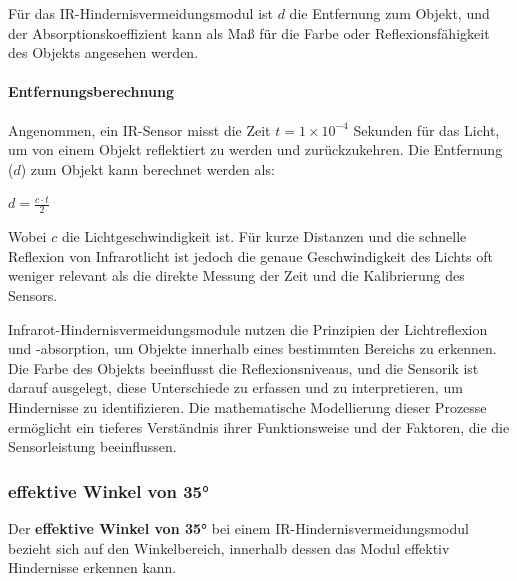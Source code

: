 \documentclass{vorlage-design-main}
\begin{document}
Für das IR-Hindernisvermeidungsmodul ist $d$ die Entfernung zum
Objekt, und der Absorptionskoeffizient kann als Maß für die Farbe oder
Reflexionsfähigkeit des Objekts angesehen werden.

\hypertarget{entfernungsberechnung}{%
\paragraph{Entfernungsberechnung}\label{entfernungsberechnung}}

Angenommen, ein IR-Sensor misst die Zeit $t = 1 \times 10^{-4}$
Sekunden für das Licht, um von einem Objekt reflektiert zu werden und
zurückzukehren. Die Entfernung ($d$) zum Objekt kann berechnet werden
als:

$d = \frac{c \cdot t}{2}$

Wobei $c$ die Lichtgeschwindigkeit ist. Für kurze Distanzen und die
schnelle Reflexion von Infrarotlicht ist jedoch die genaue
Geschwindigkeit des Lichts oft weniger relevant als die direkte Messung
der Zeit und die Kalibrierung des Sensors.

Infrarot-Hindernisvermeidungsmodule nutzen die Prinzipien der
Lichtreflexion und -absorption, um Objekte innerhalb eines bestimmten
Bereichs zu erkennen. Die Farbe des Objekts beeinflusst die
Reflexionsniveaus, und die Sensorik ist darauf ausgelegt, diese
Unterschiede zu erfassen und zu interpretieren, um Hindernisse zu
identifizieren. Die mathematische Modellierung dieser Prozesse
ermöglicht ein tieferes Verständnis ihrer Funktionsweise und der
Faktoren, die die Sensorleistung beeinflussen.

\hypertarget{effektive-winkel-von-35}{%
\subsubsection{effektive Winkel von 35°}\label{effektive-winkel-von-35}}

Der \textbf{effektive Winkel von 35°} bei einem
IR-Hindernisvermeidungsmodul bezieht sich auf den Winkelbereich,
innerhalb dessen das Modul effektiv Hindernisse erkennen kann.
\end{document}

